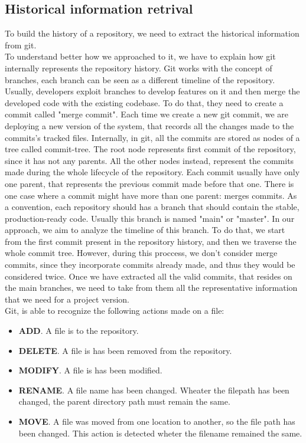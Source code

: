 \subsection*{Historical information retrival}
To build the history of a repository, we need to extract the historical information from git.\\
To understand better how we approached to it, we have to explain how git internally represents the repository history. 
Git works with the concept of branches, each branch can be seen as a different timeline of the repository.
Usually, developers exploit branches to develop features on it and then merge the developed code with the existing codebase.
To do that, they need to create a commit called "merge commit". 
Each time we create a new git commit, we are deploying a new version of the system, that records all the changes made to the commits's tracked files. 
Internally, in git, all the commits are stored as nodes of a tree called commit-tree. 
The root node represents first commit of the repository, since it has not any parents. 
All the other nodes instead, represent the commits made during the whole lifecycle of the repository. 
Each commit usually have only one parent, that represents the previous commit made before that one.
There is one case where a commit might have more than one parent: merges commits.
\bigbreak
As a convention, each repository should has a branch that should contain the stable, production-ready code. Usually this branch is named "main" or "master". 
In our approach, we aim to analyze the timeline of this branch. To do that, we start from the first commit present in the repository history, and then we traverse the whole commit tree. 
However, during this proccess, we don't consider merge commits, since they incorporate commits already made, and thus they would be considered twice. 
Once we have extracted all the valid commits, that resides on the main branches, we need to take from them all the representative information that we need for a project version. \\
\bigbreak
Git, is able to recognize the following actions made on a file:
\begin{itemize}
    \item \textbf{ADD}. A file is to the repository.
    \item \textbf{DELETE}. A file is has been removed from the repository.
    \item \textbf{MODIFY}. A file is has been modified.
    \item \textbf{RENAME}. A file name has been changed. Wheater the filepath has been changed, the parent directory path must remain the same. 
    \item \textbf{MOVE}. A file was moved from one location to another, so the file path has been changed. This action is detected wheter the filename remained the same. 
\end{itemize}

